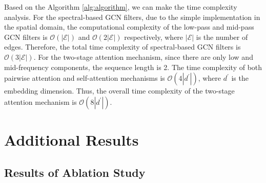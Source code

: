 \documentclass[letterpaper]{article} %
\begin{document}
 Based on the Algorithm \ref{alg:algorithm}, we can make the time complexity analysis. For the spectral-based GCN filters, due to the simple implementation in the spatial domain, the computational complexity of the low-pass and mid-pass GCN filters is $\mathcal{O}(|\mathcal{E}|)$ and $\mathcal{O}(2|\mathcal{E}|)$ respectively, where $|\mathcal{E}|$ is the number of edges. Therefore, the total time complexity of spectral-based GCN filters is $\mathcal{O}(3|\mathcal{E}|)$.
 For the two-stage attention mechanism, since there are only low and mid-frequency components, the sequence length is 2. The time complexity of both pairwise attention and self-attention mechanisms is $\mathcal{O}(4|d^{\prime}|)$, where $d^{\prime}$ is the embedding dimension. Thus, the overall time complexity of the two-stage attention mechanism is $\mathcal{O}(8|d^{\prime}|)$.


 \section{Additional Results}
 \subsection{Results of Ablation Study}
 \begin{table}
\centering
\caption{The ablation study performance.}
\label{tab:whole_ablation}
\end{table}
\end{document}
